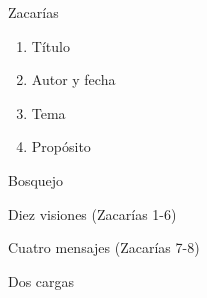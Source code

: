 \documentclass[12pt]{article}
\begin{document}
\begin{section}{Zacarías}
	\begin{enumerate}
		\item Título\\
		\item Autor y fecha\\
		\item Tema\\
		\item Propósito\\
	\end{enumerate}
	\begin{subsection}{Bosquejo}
		\begin{subsubsection}{Diez visiones (Zacarías 1-6)}
		\end{subsubsection}
		\begin{subsubsection}{Cuatro mensajes (Zacarías 7-8)}
		\end{subsubsection}
		\begin{subsubsection}{Dos cargas}
		\end{subsubsection}
	\end{subsection}
\end{section}
\end{document}
